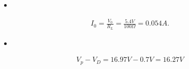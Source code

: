 \begin{itemize}
\item {\bfseries\itshape{}} \hfill \break
{\bfseries\itshape{}}
\end{itemize}

\begin{ceqn}
\begin{align}
I_{0} = \frac{V_{0}}{R_{L}} = \frac{5.4V}{100\Omega} = 0.054 A.
\end{align}
\end{ceqn}

\begin{itemize}
\item {\bfseries\itshape{}} \hfill \break
\end{itemize}

\begin{ceqn}
\begin{align}
V_{p} - V_{D} = 16.97V - 0.7V = 16.27 V
\end{align}
\end{ceqn}

\pagebreak